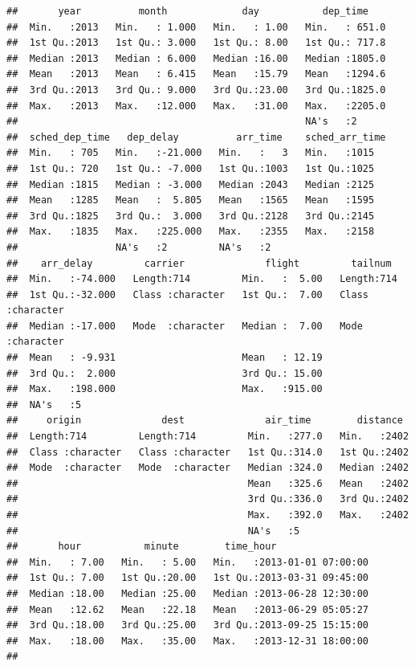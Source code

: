 \documentclass[
]{book}
\begin{document}
\begin{verbatim}
##       year          month             day           dep_time     
##  Min.   :2013   Min.   : 1.000   Min.   : 1.00   Min.   : 651.0  
##  1st Qu.:2013   1st Qu.: 3.000   1st Qu.: 8.00   1st Qu.: 717.8  
##  Median :2013   Median : 6.000   Median :16.00   Median :1805.0  
##  Mean   :2013   Mean   : 6.415   Mean   :15.79   Mean   :1294.6  
##  3rd Qu.:2013   3rd Qu.: 9.000   3rd Qu.:23.00   3rd Qu.:1825.0  
##  Max.   :2013   Max.   :12.000   Max.   :31.00   Max.   :2205.0  
##                                                  NA's   :2       
##  sched_dep_time   dep_delay          arr_time    sched_arr_time
##  Min.   : 705   Min.   :-21.000   Min.   :   3   Min.   :1015  
##  1st Qu.: 720   1st Qu.: -7.000   1st Qu.:1003   1st Qu.:1025  
##  Median :1815   Median : -3.000   Median :2043   Median :2125  
##  Mean   :1285   Mean   :  5.805   Mean   :1565   Mean   :1595  
##  3rd Qu.:1825   3rd Qu.:  3.000   3rd Qu.:2128   3rd Qu.:2145  
##  Max.   :1835   Max.   :225.000   Max.   :2355   Max.   :2158  
##                 NA's   :2         NA's   :2                    
##    arr_delay         carrier              flight         tailnum         
##  Min.   :-74.000   Length:714         Min.   :  5.00   Length:714        
##  1st Qu.:-32.000   Class :character   1st Qu.:  7.00   Class :character  
##  Median :-17.000   Mode  :character   Median :  7.00   Mode  :character  
##  Mean   : -9.931                      Mean   : 12.19                     
##  3rd Qu.:  2.000                      3rd Qu.: 15.00                     
##  Max.   :198.000                      Max.   :915.00                     
##  NA's   :5                                                               
##     origin              dest              air_time        distance   
##  Length:714         Length:714         Min.   :277.0   Min.   :2402  
##  Class :character   Class :character   1st Qu.:314.0   1st Qu.:2402  
##  Mode  :character   Mode  :character   Median :324.0   Median :2402  
##                                        Mean   :325.6   Mean   :2402  
##                                        3rd Qu.:336.0   3rd Qu.:2402  
##                                        Max.   :392.0   Max.   :2402  
##                                        NA's   :5                     
##       hour           minute        time_hour                  
##  Min.   : 7.00   Min.   : 5.00   Min.   :2013-01-01 07:00:00  
##  1st Qu.: 7.00   1st Qu.:20.00   1st Qu.:2013-03-31 09:45:00  
##  Median :18.00   Median :25.00   Median :2013-06-28 12:30:00  
##  Mean   :12.62   Mean   :22.18   Mean   :2013-06-29 05:05:27  
##  3rd Qu.:18.00   3rd Qu.:25.00   3rd Qu.:2013-09-25 15:15:00  
##  Max.   :18.00   Max.   :35.00   Max.   :2013-12-31 18:00:00  
## 
\end{verbatim}
\end{document}
